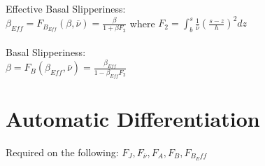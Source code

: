 \documentclass{report}
\begin{document}
Effective Basal Slipperiness:\\  
$\beta_{Eff} = F_{B_{Eff}}(\beta,\overline{\nu}) = \frac{\beta}{1 + \beta F_{2}}$ \quad\quad\quad\quad\quad\quad\quad where $F_{2} = \int_{b}^{s}\frac{1}{\overline{\nu}} (\frac{s -z}{h})^{2} dz$\\\\

Basal Slipperiness: \\ 
$\beta = F_{B}(\beta_{Eff},\overline{\nu}) = \frac{\beta_{Eff}}{1 - \beta_{Eff} F_{2}}$ 

\section*{Automatic Differentiation}
Required on the following: $F_{J}, F_{\overline{\nu}}, F_{A}, F_{B}, F_{B_Eff}$
\end{document}

